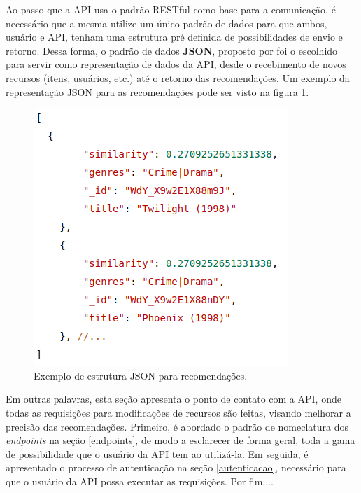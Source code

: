 \documentclass[12pt, openright, oneside, a4paper, brazil]{abntex2}
\begin{document}
Ao passo que a API usa o padrão RESTful como base para a comunicação, é necessário que a mesma utilize um único padrão de dados para que ambos, usuário e API, tenham uma estrutura pré definida de possibilidades de envio e retorno. Dessa forma, o padrão de dados \textbf{JSON}, proposto por  foi o escolhido para servir como representação de dados da API, desde o recebimento de novos recursos (itens, usuários, etc.) até o retorno das recomendações. Um exemplo da representação JSON para as recomendações pode ser visto na figura \ref{json_example}.

\begin{figure}[h!tp]

	\caption{\label{json_example}Exemplo de estrutura JSON para recomendações.}

	\begin{center}
		\includegraphics[scale=0.75]{images/json_example.png}
	\end{center}

	\hspace{5.5cm}{Fonte: O Autor.}

\end{figure}

Em outras palavras, esta seção apresenta o ponto de contato com a API, onde todas as requisições para modificações de recursos são feitas, visando melhorar a precisão das recomendações. Primeiro, é abordado o padrão de nomeclatura dos \textit{endpoints} na seção \ref{endpoints}, de modo a esclarecer de forma geral, toda a gama de possibilidade que o usuário da API tem ao utilizá-la. Em seguida, é apresentado o processo de autenticação na seção \ref{autenticacao}, necessário para que o usuário da API possa executar as requisições. Por fim,... 
\end{document}
